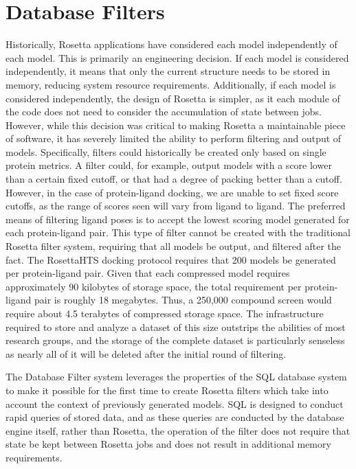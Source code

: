 \section{Database Filters}

Historically, Rosetta applications have considered each model independently of each model.
This is primarily an engineering decision.
If each model is considered independently, it means that only the current structure needs to be stored in memory, reducing system resource requirements. 
Additionally, if each model is considered independently, the design of Rosetta is simpler, as it each module of the code does not need to consider the accumulation of state between jobs.
However, while this decision was critical to making Rosetta a maintainable piece of software, it has severely limited the ability to perform filtering and output of models. 
Specifically, filters could historically be created only based on single protein metrics.
A filter could, for example, output models with a score lower than a certain fixed cutoff, or that had a degree of packing better than a cutoff.
However, in the case of protein-ligand docking, we are unable to set fixed score cutoffs, as the range of scores seen will vary from ligand to ligand.
The preferred means of filtering ligand poses is to accept the lowest scoring model generated for each protein-ligand pair.
This type of filter cannot be created with the traditional Rosetta filter system, requiring that all models be output, and filtered after the fact.
The RosettaHTS docking protocol requires that 200 models be generated per protein-ligand pair. 
Given that each compressed model requires approximately 90 kilobytes of storage space, the total requirement per protein-ligand pair is roughly 18 megabytes.
Thus, a 250,000 compound screen would require about 4.5 terabytes of compressed storage space. 
The infrastructure required to store and analyze a dataset of this size outstrips the abilities of most research groups, and the storage of the complete dataset is particularly senseless as nearly all of it will be deleted after the initial round of filtering. 

The Database Filter system leverages the properties of the \ac{SQL} database system to make it possible for the first time to create Rosetta filters which take into account the context of previously generated models.
\ac{SQL} is designed to conduct rapid queries of stored data, and as these queries are conducted by the database engine itself, rather than Rosetta, the operation of the filter does not require that state be kept between Rosetta jobs and does not result in additional memory requirements.

